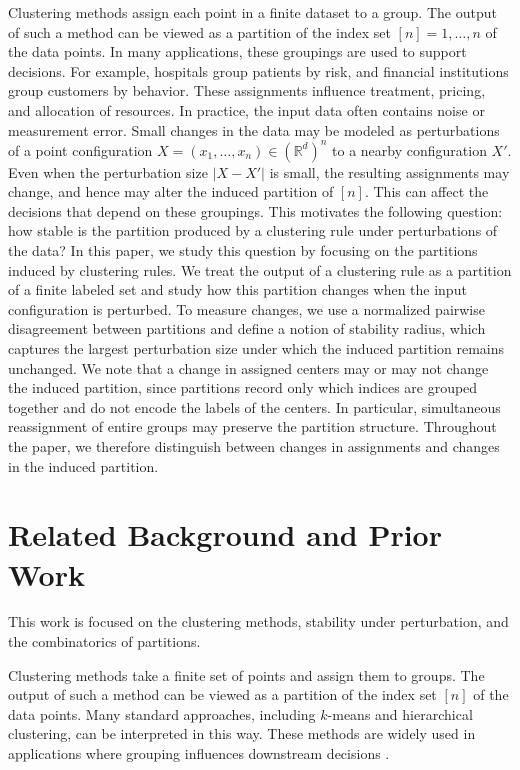 \documentclass[11pt]{amsart}
\theoremstyle{plain}
\theoremstyle{definition}
\begin{document}
Clustering methods assign each point in a finite dataset to a group. The output of such a method can be viewed as a partition of the index set $[n] = {1, \dots, n}$ of the data points. In many applications, these groupings are used to support decisions. For example, hospitals group patients by risk, and financial institutions group customers by behavior. These assignments influence treatment, pricing, and allocation of resources. In practice, the input data often contains noise or measurement error. Small changes in the data may be modeled as perturbations of a point configuration $X = (x_1, \dots, x_n) \in (\mathbb{R}^d)^n$ to a nearby configuration $X'$. Even when the perturbation size $|X - X'|$ is small, the resulting assignments may change, and hence may alter the induced partition of $[n]$. This can affect the decisions that depend on these groupings. This motivates the following question: how stable is the partition produced by a clustering rule under perturbations of the data? In this paper, we study this question by focusing on the partitions induced by clustering rules. We treat the output of a clustering rule as a partition of a finite labeled set and study how this partition changes when the input configuration is perturbed. To measure changes, we use a normalized pairwise disagreement between partitions and define a notion of stability radius, which captures the largest perturbation size under which the induced partition remains unchanged. We note that a change in assigned centers may or may not change the induced partition, since partitions record only which indices are grouped together and do not encode the labels of the centers. In particular, simultaneous reassignment of entire groups may preserve the partition structure. Throughout the paper, we therefore distinguish between changes in assignments and changes in the induced partition.

\section{Related Background and Prior Work}

This work is focused on the clustering methods, stability under perturbation, and the combinatorics of partitions.

Clustering methods take a finite set of points and assign them to groups. The output of such a method can be viewed as a partition of the index set $[n]$ of the data points. Many standard approaches, including $k$-means and hierarchical clustering, can be interpreted in this way. These methods are widely used in applications where grouping influences downstream decisions \cite{1,2}.
\end{document}
